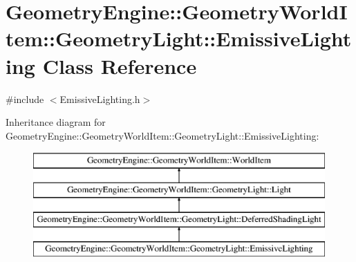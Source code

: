 \hypertarget{class_geometry_engine_1_1_geometry_world_item_1_1_geometry_light_1_1_emissive_lighting}{}\section{Geometry\+Engine\+::Geometry\+World\+Item\+::Geometry\+Light\+::Emissive\+Lighting Class Reference}
\label{class_geometry_engine_1_1_geometry_world_item_1_1_geometry_light_1_1_emissive_lighting}


{\ttfamily \#include $<$Emissive\+Lighting.\+h$>$}

Inheritance diagram for Geometry\+Engine\+::Geometry\+World\+Item\+::Geometry\+Light\+::Emissive\+Lighting\+:\begin{figure}[H]
\begin{center}
\leavevmode
\includegraphics[height=4.000000cm]{class_geometry_engine_1_1_geometry_world_item_1_1_geometry_light_1_1_emissive_lighting}
\end{center}
\end{figure}
